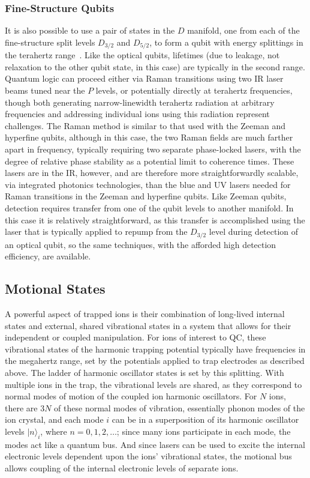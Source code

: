 \documentclass[%
12pt,
 amsmath,amssymb,
]{revtex4-2}
\begin{document}
\subsubsection{Fine-Structure Qubits}
\label{subsubFine-Structure}

It is also possible to use a pair of states in the $D$ manifold, one from each of the fine-structure split levels $D_{3/2}$ and $D_{5/2}$, to form a qubit with energy splittings in the terahertz range~\cite{PhysRevA.81.032322}.  Like the optical qubits, lifetimes (due to leakage, not relaxation to the other qubit state, in this case) are typically in the second range.  Quantum logic can proceed either via Raman transitions using two IR laser beams tuned near the $P$ levels, or potentially directly at terahertz frequencies, though both generating narrow-linewidth terahertz radiation at arbitrary frequencies and addressing individual ions using this radiation represent challenges. The Raman method is similar to that used with the Zeeman and hyperfine qubits, although in this case, the two Raman fields are much farther apart in frequency, typically requiring two separate phase-locked lasers, with the degree of relative phase stability as a potential limit to coherence times.  These lasers are in the IR, however, and are therefore more straightforwardly scalable, via integrated photonics technologies, than the blue and UV lasers needed for Raman transitions in the Zeeman and hyperfine qubits.  Like Zeeman qubits, detection requires transfer from one of the qubit levels to another manifold.  In this case it is relatively straightforward, as this transfer is accomplished using the laser that is typically applied to repump from the $D_{3/2}$ level during detection of an optical qubit, so the same techniques, with the afforded high detection efficiency, are available.

\subsection{Motional States}

A powerful aspect of trapped ions is their combination of long-lived internal states and external, shared vibrational states in a system that allows for their independent or coupled manipulation.  For ions of interest to QC, these vibrational states of the harmonic trapping potential typically have frequencies in the megahertz range, set by the potentials applied to trap electrodes as described above.  The ladder of harmonic oscillator states is set by this splitting.  With multiple ions in the trap, the vibrational levels are shared, as they correspond to normal modes of motion of the coupled ion harmonic oscillators.  For $N$ ions, there are $3N$ of these normal modes of vibration, essentially phonon modes of the ion crystal, and each mode $i$ can be in a superposition of its harmonic oscillator levels $|n\rangle_{i}$, where $n=0, 1, 2, \ldots$; since many ions participate in each mode, the modes act like a quantum bus.  And since lasers can be used to excite the internal electronic levels dependent upon the ions' vibrational states, the motional bus allows coupling of the internal electronic levels of separate ions.
\end{document}
